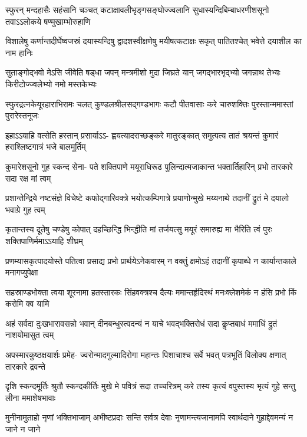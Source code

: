 \documentclass[a5paper,twoside,12pt]{book}
\begin{document}
\begin{center}
\fourlineindentedshloka
{स्फुरन् मन्दहासैः सहंसानि चञ्चत्}
{कटाक्षावलीभृङ्गसङ्घोज्ज्वलानि}
{सुधास्यन्दिबिम्बाधरणीशसूनो}
{तवाऽऽलोकये षण्मुखाम्भोरुहाणि}

\fourlineindentedshloka
{विशालेषु कर्णान्तदीर्घेष्वजस्रं}
{दयास्यन्दिषु द्वादशस्वीक्षणेषु}
{मयीषत्कटाक्षः सकृत् पातितश्चेत्}
{भवेत्ते दयाशील का नाम हानिः}

\fourlineindentedshloka
{सुताङ्गोद्भवो मेऽसि जीवेति षड्धा}
{जपन् मन्त्रमीशो मुदा जिघ्रते यान्}
{जगद्भारभृद्भ्यो जगन्नाथ तेभ्यः}
{किरीटोज्ज्वलेभ्यो नमो मस्तकेभ्यः}

\fourlineindentedshloka
{स्फुरद्रत्नकेयूरहाराभिरामः}
{चलत् कुण्डलश्रीलसद्गण्डभागः}
{कटौ पीतवासाः करे चारुशक्तिः}
{पुरस्तान्ममास्तां पुरारेस्तनूजः}

\fourlineindentedshloka
{इहाऽऽयाहि वत्सेति हस्तान् प्रसार्याऽऽ-}
{ह्वयत्यादराच्छङ्करे मातुरङ्कात्}
{समुत्पत्य तातं श्रयन्तं कुमारं}
{हराश्लिष्टगात्रं भजे बालमूर्तिम्}

\fourlineindentedshloka
{कुमारेशसूनो गुह स्कन्द सेना-}
{पते शक्तिपाणे मयूराधिरूढ}
{पुलिन्दात्मजाकान्त भक्तार्तिहारिन्}
{प्रभो तारकारे सदा रक्ष मां त्वम्}

\fourlineindentedshloka
{प्रशान्तेन्द्रिये नष्टसंज्ञे विचेष्टे}
{कफोद्गारिवक्त्रे भयोत्कम्पिगात्रे}
{प्रयाणोन्मुखे मय्यनाथे तदानीं}
{द्रुतं मे दयालो भवाग्रे गुह त्वम्}

\fourlineindentedshloka
{कृतान्तस्य दूतेषु चण्डेषु कोपात्}
{दहच्छिन्द्धि भिन्द्धीति मां तर्जयत्सु}
{मयूरं समारुह्य मा भैरिति त्वं}
{पुरः शक्तिपाणिर्ममाऽऽयाहि शीघ्रम्}

\fourlineindentedshloka
{प्रणम्यासकृत्पादयोस्ते पतित्वा}
{प्रसाद्य प्रभो प्रार्थयेऽनेकवारम्}
{न वक्तुं क्षमोऽहं तदानीं कृपाब्धे}
{न कार्यान्तकाले मनागप्युपेक्षा}

\fourlineindentedshloka
{सहस्राण्डभोक्ता त्वया शूरनामा}
{हतस्तारकः सिंहवक्त्रश्च दैत्यः}
{ममान्तर्हृदिस्थं मनःक्लेशमेकं}
{न हंसि प्रभो किं करोमि क्व यामि}

\fourlineindentedshloka
{अहं सर्वदा दुःखभारावसन्नो}
{भवान् दीनबन्धुस्त्वदन्यं न याचे}
{भवद्भक्तिरोधं सदा कॢप्तबाधं}
{ममाधिं द्रुतं नाशयोमासुत त्वम्}

\fourlineindentedshloka
{अपस्मारकुष्ठक्षयार्शः प्रमेह-}
{ज्वरोन्मादगुल्मादिरोगा महान्तः}
{पिशाचाश्च सर्वे भवत् पत्रभूतिं}
{विलोक्य क्षणात् तारकारे द्रवन्ते}

\fourlineindentedshloka
{दृशि स्कन्दमूर्तिः श्रुतौ स्कन्दकीर्तिः}
{मुखे मे पवित्रं सदा तच्चरित्रम्}
{करे तस्य कृत्यं वपुस्तस्य भृत्यं}
{गुहे सन्तु लीना ममाशेषभावाः}

\fourlineindentedshloka
{मुनीनामुताहो नृणां भक्तिभाजाम्}
{अभीष्टप्रदाः सन्ति सर्वत्र देवाः}
{नृणामन्त्यजानामपि स्वार्थदाने}
{गुहाद्देवमन्यं न जाने न जाने}


\end{center}
\end{document}
